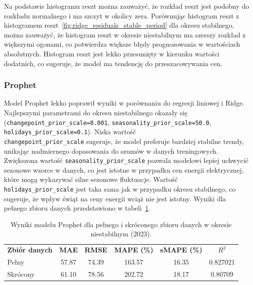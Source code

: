 Na podstawie histogramu reszt można zauważyć, że rozkład reszt jest podobny do rozkładu normalnego i ma szczyt w okolicy zera. Porównując histogram reszt z histogramem reszt~\ref{fig:ridge_residuals_stable_period} dla okresu stabilnego, można zauważyć, że histogram reszt w okresie niestabilnym ma szerszy rozkład z większymi ogonami, co potwierdza większe błędy prognozowania w wartościach absolutnych. Histogram reszt jest lekko przesunięty w kierunku wartości dodatnich, co sugeruje, że model ma tendencję do przeszacowywania cen.

\subsubsection{Prophet}

Model Prophet lekko poprawił wyniki w porównaniu do regresji liniowej i Ridge. Najlepszymi parametrami do okresu niestabilnego okazały się (\texttt{changepoint\_prior\_scale=0.001}, \texttt{seasonality\_prior\_scale=50.0}, \texttt{holidays\_prior\_scale=0.1}).
Niska wartość\\ {\texttt{changepoint\_prior\_scale}} sugeruje, że model preferuje bardziej stabilne trendy, unikając nadmiernego dopasowania do szumów w danych treningowych. Zwiększona wartość {\texttt{seasonality\_prior\_scale}} pozwala modelowi lepiej uchwycić sezonowe wzorce w danych, co jest istotne w przypadku cen energii elektrycznej, które mogą wykazywać silne sezonowe fluktuacje. Wartość {\texttt{holidays\_prior\_scale}} jest taka sama jak w przypadku okresu stabilnego, co sugeruje, że wpływ świąt na ceny energii wciąż nie jest istotny. Wyniki dla pełnego zbioru danych przedstawiono w tabeli~\ref{tab:prophet_results_combined_nonstable}.

\begin{table}[H]
    \centering
    \caption{Wyniki modelu Prophet dla pełnego i skróconego zbioru danych w okresie niestabilnym (2023).}
    \label{tab:prophet_results_combined_nonstable}
    \begin{tabular}{|l|ccccc|}
        \hline
            \textbf{Zbiór danych} & \textbf{MAE} & \textbf{RMSE} & \textbf{MAPE (\%)} & \textbf{sMAPE (\%)} & \textbf{\(R^2\)} \\
            Pełny     & 57.87 & 74.39 & 163.57 & 16.35 & 0.827021 \\
            Skrócony  & 61.10 & 78.56 & 202.72 & 18.17 & 0.80709 \\
            \hline
    \end{tabular}
\end{table}

